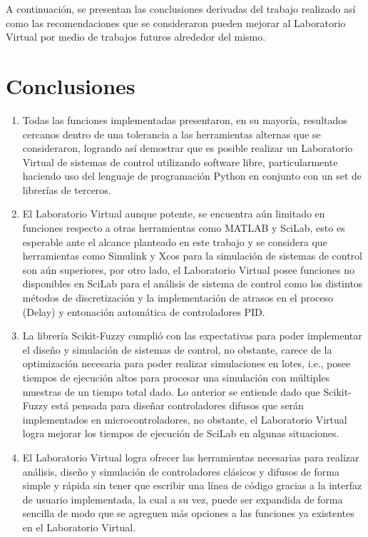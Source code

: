 A continuación, se presentan las conclusiones derivadas del trabajo realizado así como las recomendaciones que se consideraron pueden mejorar al Laboratorio Virtual por medio de trabajos futuros alrededor del mismo.

\section{Conclusiones}

    \begin{enumerate}[leftmargin=15pt]
        \setlength\itemsep{10pt}    
        \item Todas las funciones implementadas presentaron, en su mayoría, resultados cercanos dentro de una tolerancia a las herramientas alternas que se consideraron, logrando así demostrar que es posible realizar un Laboratorio Virtual de sistemas de control utilizando software libre, particularmente haciendo uso del lenguaje de programación Python en conjunto con un set de librerías de terceros.
        
        \item El Laboratorio Virtual aunque potente, se encuentra aún limitado en funciones respecto a otras herramientas como MATLAB y SciLab, esto es esperable ante el alcance planteado en este trabajo y se considera que herramientas como Simulink y Xcos para la simulación de sistemas de control son aún superiores, por otro lado, el Laboratorio Virtual posee funciones no disponibles en SciLab para el análisis de sistema de control como los distintos métodos de discretización y la implementación de atrasos en el proceso (Delay) y entonación automática de controladores PID.
        
        \item La librería Scikit-Fuzzy cumplió con las expectativas para poder implementar el diseño y simulación de sistemas de control, no obstante, carece de la optimización necesaria para poder realizar simulaciones en lotes, i.e., posee tiempos de ejecución altos para procesar una simulación con múltiples muestras de un tiempo total dado. Lo anterior se entiende dado que Scikit-Fuzzy está pensada para diseñar controladores difusos que serán implementados en microcontroladores, no obstante, el Laboratorio Virtual logra mejorar los tiempos de ejecución de SciLab en algunas situaciones.
        
        \item El Laboratorio Virtual logra ofrecer las herramientas necesarias para realizar análisis, diseño y simulación de controladores clásicos y difusos de forma simple y rápida sin tener que escribir una línea de código gracias a la interfaz de usuario implementada, la cual a su vez, puede ser expandida de forma sencilla de modo que se agreguen más opciones a las funciones ya existentes en el Laboratorio Virtual.
        

\end{enumerate}

